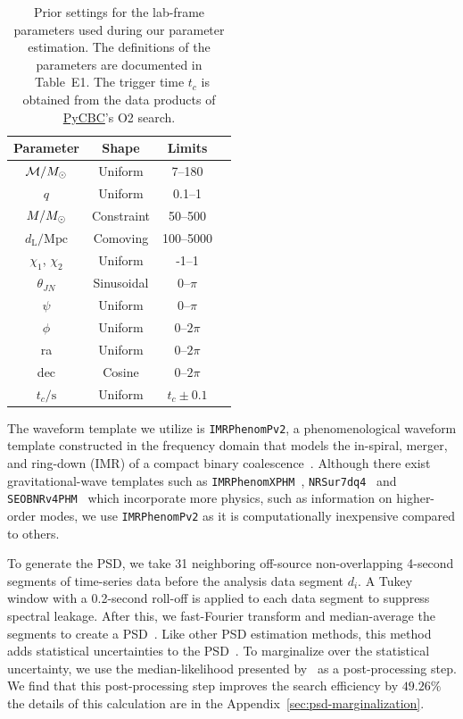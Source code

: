 \documentclass[
 nofootinbib,
 amsmath,amssymb,
 aps,
 twocolumn,
 superscriptaddress
]{revtex4-2}
\newcommand{\imrphenomp}{{\sc \texttt{IMRPhenomPv2}}\xspace}
\newcommand{\seob}{{\sc \texttt{SEOBNRv4PHM}}\xspace}
\newcommand{\nrsur}{{\sc \texttt{NRSur7dq4}}\xspace}
\newcommand{\imrxhm}{{\sc \texttt{IMRPhenomXPHM}}\xspace}
\newcommand{\pycbc}{{\sc \href{https://pycbc.org/}{{PyCBC}}}\xspace}
\newcommand{\mathcmd}[1]{{\sc \relax\ifmmode#1\else $#1$\fi}\xspace}
\newcommand{\msun}{\mathcmd{M_\odot}}
\begin{document}
\begin{table}
    \centering
    \caption{
    Prior settings for the lab-frame parameters used during our parameter estimation. The definitions of the parameters are documented in \citet{bilby_gwtc}~Table~E1. The trigger time $t_c$ is obtained from the data products of \pycbc's O2 search. \label{tab:priors}} 
    \begin{tabular}{c c c c}
    \hline
    Parameter & Shape & Limits \\
    \hline
          $\mathcal{M}/\msun$           & Uniform & 7--180  \\
          $q$                           & Uniform & 0.1--1  \\
          $M/\msun$                     & Constraint & 50--500  \\
          $d_\mathrm{L}/\mathrm{Mpc}$   & Comoving & 100--5000  \\
          $\chi_1$, $\chi_2$            & Uniform & -1--1  \\
          $\theta_{JN}$                 & Sinusoidal & 0--$\pi$  \\
          $\psi$                        & Uniform & 0--$\pi$  \\
          $\phi$                        & Uniform & 0--$2\pi$  \\
          ra                            & Uniform & 0--$2\pi$  \\
          dec                           & Cosine & 0--$2\pi$  \\
          $t_c/\mathrm{s}$              & Uniform & $t_c\pm0.1$  \\
    \hline
    \end{tabular}
\end{table}

The waveform template we utilize is \imrphenomp, a phenomenological waveform template constructed in the frequency domain that models the in-spiral, merger, and ring-down (IMR) of a compact binary coalescence~\citep{khan2016frequency}. Although there exist gravitational-wave templates such as \imrxhm~\cite{imrphenompxhm}, \nrsur~\cite{nrsur7dq4} and \seob~\cite{seobnrv4phm} which incorporate more physics, such as information on higher-order modes, we use \imrphenomp as it is computationally inexpensive compared to others.

To generate the PSD, we take 31 neighboring off-source non-overlapping  4-second  segments of time-series data before the analysis data segment $d_i$. A Tukey window with a 0.2-second roll-off is applied to each data segment to suppress spectral leakage. After this, we fast-Fourier transform and median-average the segments to create a PSD~\cite{ligo_psd}. Like other PSD estimation methods, this method adds statistical uncertainties to the PSD~\cite{psd_student_t, chatziioannou2019noise, Biscoveanu:2020:PhRvD}. To marginalize over the statistical uncertainty, we use the median-likelihood presented by~\citet{psd_student_t} as a post-processing step. We find that this post-processing step improves the search efficiency by $49.26\%$ the details of this calculation are in the Appendix~\ref{sec:psd-marginalization}.
\end{document}
